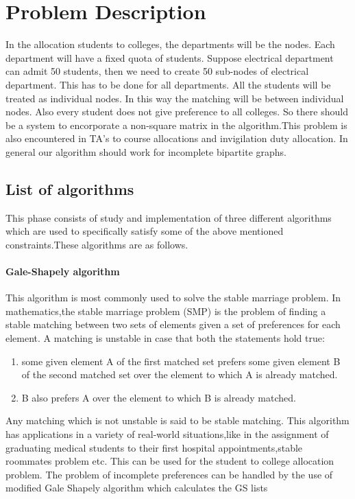 \documentclass[a4paper]{report}
\theoremstyle{definition}
\begin{document}
\chapter{Problem Description}

In the allocation students to colleges, the departments will be the nodes. Each department will have a fixed quota of students. Suppose electrical department can admit 50 students, then we need to create 50 sub-nodes of electrical department. This has to be done for all departments. All the students will be treated as individual nodes. In this way the matching will be between individual nodes. Also every student does not give preference to all colleges. So there should be a system to encorporate a non-square matrix in the algorithm.This problem is also encountered in TA's to course allocations and invigilation duty allocation. In general our algorithm should work for incomplete bipartite graphs.

\section{List of algorithms}
This phase consists of study and implementation of three different algorithms which are used to specifically satisfy some of the above mentioned constraints.These algorithms are as follows.
\subsubsection{Gale-Shapely algorithm} 

This algorithm is most commonly used to solve the stable marriage problem. In mathematics,the stable marriage problem (SMP) is the problem of finding a stable matching between two sets of elements given a set of preferences for each element.
A matching is unstable in case that both the statements hold true:
\begin{enumerate}
\item some given element A of the first matched set prefers some given element B of the second matched set over the element to which A is already matched.
\item B also prefers A over the element to which B is already matched.
\end{enumerate}
Any matching which is not unstable is said to be stable matching.
This algorithm has applications in a variety of real-world situations,like in the assignment of graduating medical students to their first hospital appointments,stable roommates problem etc. This can be used for the student to college allocation problem. The problem of incomplete preferences can be handled by the use of modified Gale Shapely algorithm which calculates the GS lists
\end{document}

